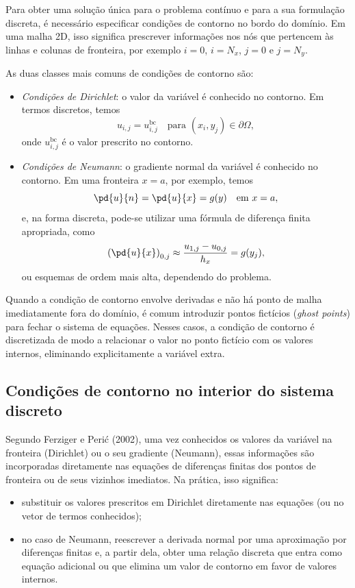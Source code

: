 Para obter uma solução única para o problema contínuo e para a sua formulação 
discreta, é necessário especificar condições de contorno no bordo do domínio. 
Em uma malha 2D, isso significa prescrever informações nos nós que pertencem
às linhas e colunas de fronteira, por exemplo $i=0$, $i=N_x$, $j=0$ e $j=N_y$.

As duas classes mais comuns de condições de contorno são:

\begin{itemize}
    \item \emph{Condições de Dirichlet}: o valor da variável é conhecido 
    no contorno. Em termos discretos, temos
    \[
    u_{i,j} = u^{\text{bc}}_{i,j} 
    \quad \text{para } (x_i,y_j) \in \partial\Omega,
    \]
    onde $u^{\text{bc}}_{i,j}$ é o valor prescrito no contorno.
    
    \item \emph{Condições de Neumann}: o gradiente normal da variável é 
    conhecido no contorno. Em uma fronteira $x=a$, por exemplo, temos
    \[
    \pd{u}{n} = \pd{u}{x} = g(y) \quad \text{em } x=a,
    \]
    e, na forma discreta, pode-se utilizar uma fórmula de diferença finita 
    apropriada, como
    \[
    \left(\pd{u}{x}\right)_{0,j}
    \approx \frac{u_{1,j} - u_{0,j}}{h_x} = g(y_j),
    \]
    ou esquemas de ordem mais alta, dependendo do problema.
\end{itemize}

Quando a condição de contorno envolve derivadas e não há ponto de malha 
imediatamente fora do domínio, é comum introduzir pontos fictícios 
(\emph{ghost points}) para fechar o sistema de equações. Nesses casos, 
a condição de contorno é discretizada de modo a relacionar o valor no 
ponto fictício com os valores internos, eliminando explicitamente a 
variável extra.

\subsection{Condições de contorno no interior do sistema discreto}

Segundo Ferziger e Perić (2002), uma vez conhecidos os valores da variável 
na fronteira (Dirichlet) ou o seu gradiente (Neumann), essas informações 
são incorporadas diretamente nas equações de diferenças finitas dos pontos 
de fronteira ou de seus vizinhos imediatos. Na prática, isso significa:

\begin{itemize}
    \item substituir os valores prescritos em Dirichlet diretamente nas 
    equações (ou no vetor de termos conhecidos);
    \item no caso de Neumann, reescrever a derivada normal por uma 
    aproximação por diferenças finitas e, a partir dela, obter uma relação
    discreta que entra como equação adicional ou que elimina um valor
    de contorno em favor de valores internos.
\end{itemize}




